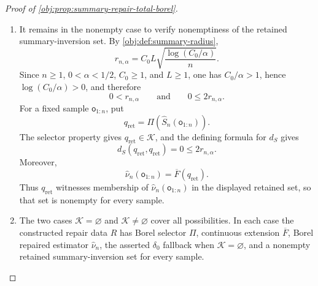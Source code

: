 \documentclass[11pt]{article}
\begin{document}
\begin{proof}[Proof of \cref{obj:prop:summary-repair-total-borel}]
\begin{enumerate}
\item It remains in the nonempty case to verify nonemptiness of the retained summary-inversion set.  By \cref{obj:def:summary-radius},
\[
r_{n,\alpha}
=
C_0L\sqrt{\frac{\log(C_0/\alpha)}{n}} .
\]
Since \(n\ge 1\), \(0<\alpha<1/2\), \(C_0\ge 1\), and \(L\ge 1\), one has \(C_0/\alpha>1\), hence \(\log(C_0/\alpha)>0\), and therefore
\[
0<r_{n,\alpha}
\qquad\text{and}\qquad
0\le 2r_{n,\alpha}.
\]
For a fixed sample \(\mathsf o_{1:n}\), put
\[
q_{\mathrm{ret}}=\Pi(\widehat S_n(\mathsf o_{1:n})) .
\]
The selector property gives \(q_{\mathrm{ret}}\in\mathcal K\), and the defining formula for \(d_S\) gives
\[
d_S(q_{\mathrm{ret}},q_{\mathrm{ret}})=0\le 2r_{n,\alpha}.
\]
Moreover,
\[
\widehat\nu_n(\mathsf o_{1:n})
=
\overline F(q_{\mathrm{ret}}).
\]
Thus \(q_{\mathrm{ret}}\) witnesses membership of \(\widehat\nu_n(\mathsf o_{1:n})\) in the displayed retained set, so that set is nonempty for every sample. \hfill{}%

\item The two cases \(\mathcal K=\varnothing\) and \(\mathcal K\ne\varnothing\) cover all possibilities.  In each case the constructed repair data \(R\) has Borel selector \(\Pi\), continuous extension \(\overline F\), Borel repaired estimator \(\widehat\nu_n\), the asserted \(\delta_0\) fallback when \(\mathcal K=\varnothing\), and a nonempty retained summary-inversion set for every sample. \hfill{}%
\end{enumerate}
\end{proof}
\end{document}
